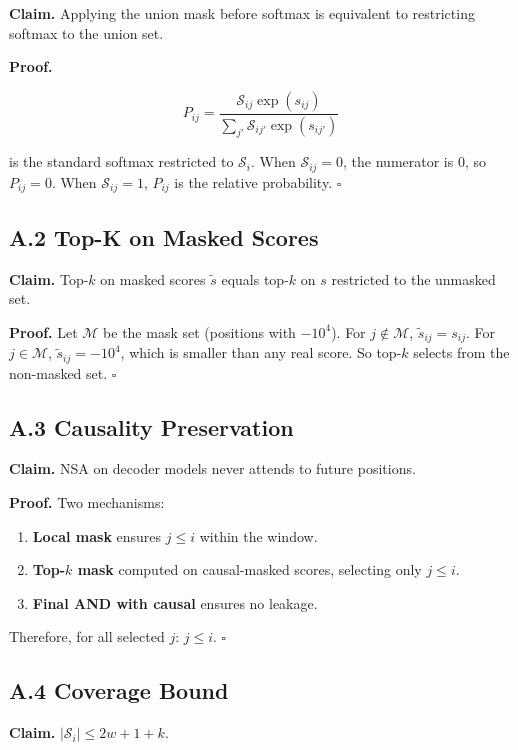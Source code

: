 \textbf{Claim.} Applying the union mask before softmax is equivalent to 
restricting softmax to the union set.

\textbf{Proof.} 

\[
P_{ij} = \frac{\mathcal{S}_{ij} \exp(s_{ij})}{\sum_{j'} \mathcal{S}_{ij'} \exp(s_{ij'})}
\tag{A.1}
\]

is the standard softmax restricted to $\mathcal{S}_i$. When $\mathcal{S}_{ij} = 0$, the numerator is 0, so $P_{ij} = 0$. When $\mathcal{S}_{ij} = 1$, $P_{ij}$ is the relative probability. $\square$

\subsection{A.2 Top-K on Masked Scores}

\textbf{Claim.} Top-$k$ on masked scores $\tilde{s}$ equals top-$k$ on $s$ restricted 
to the unmasked set.

\textbf{Proof.} Let $\mathcal{M}$ be the mask set (positions with $-10^4$). For 
$j \notin \mathcal{M}$, $\tilde{s}_{ij} = s_{ij}$. For $j \in \mathcal{M}$, 
$\tilde{s}_{ij} = -10^4$, which is smaller than any real score. So top-$k$ 
selects from the non-masked set. $\square$

\subsection{A.3 Causality Preservation}

\textbf{Claim.} NSA on decoder models never attends to future positions.

\textbf{Proof.} Two mechanisms:

\begin{enumerate}
\item \textbf{Local mask} ensures $j \leq i$ within the window.
\item \textbf{Top-$k$ mask} computed on causal-masked scores, selecting only
  $j \leq i$.
\item \textbf{Final AND with causal} ensures no leakage.

\end{enumerate}
Therefore, for all selected $j$: $j \leq i$. $\square$

\subsection{A.4 Coverage Bound}

\textbf{Claim.} $|\mathcal{S}_i| \leq 2w + 1 + k$.

